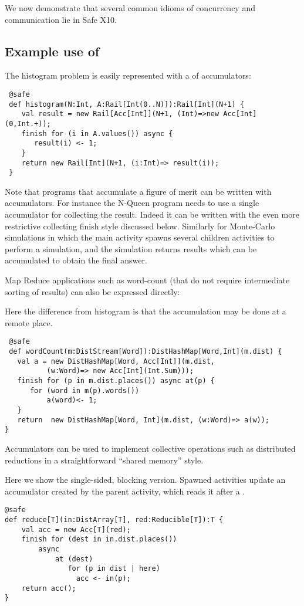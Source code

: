 We now demonstrate that several common idioms of concurrency and
communication lie in Safe X10.

\subsection{Example use of }
\begin{example}[Histogram]
The histogram problem is easily represented with a  of
accumulators:
\begin{lstlisting}
 @safe
 def histogram(N:Int, A:Rail[Int(0..N)]):Rail[Int](N+1) {
    val result = new Rail[Acc[Int]](N+1, (Int)=>new Acc[Int](0,Int.+));
    finish for (i in A.values()) async {
       result(i) <- 1;
    }
    return new Rail[Int](N+1, (i:Int)=> result(i));
 }
\end{lstlisting}
\end{example}
Note that programs that accumulate a figure of merit can be written
with accumulators. For instance the N-Queen program needs to use a
single accumulator for collecting the result. Indeed it can be written
with the even more restrictive collecting finish style discussed
below. Similarly for Monte-Carlo simulations in which the main
activity spawns several children activities to perform a simulation,
and the simulation returns results which can be accumulated to
obtain the final answer.

Map Reduce applications such as word-count (that do not require
intermediate sorting of results) can also be expressed directly:
\begin{example}
Here the difference from histogram is that the accumulation may be
done at a remote place.
\begin{lstlisting}
 @safe
 def wordCount(m:DistStream[Word]):DistHashMap[Word,Int](m.dist) {
   val a = new DistHashMap[Word, Acc[Int]](m.dist,
          (w:Word)=> new Acc[Int](Int.Sum)));
   finish for (p in m.dist.places()) async at(p) {
      for (word in m(p).words())
          a(word)<- 1;
   }
   return  new DistHashMap[Word, Int](m.dist, (w:Word)=> a(w));
}
\end{lstlisting}

\end{example}


Accumulators can be used to implement collective operations such as
distributed reductions in a straightforward ``shared memory'' style.

\begin{example}[Reduction]
Here we show the single-sided, blocking version. Spawned activities
update an accumulator created by the parent activity, which reads it
after a .
  \begin{lstlisting}
@safe
def reduce[T](in:DistArray[T], red:Reducible[T]):T {
    val acc = new Acc[T](red);
    finish for (dest in in.dist.places())
        async
            at (dest)
               for (p in dist | here)
                 acc <- in(p);
    return acc();
}
\end{lstlisting}
\end{example}


